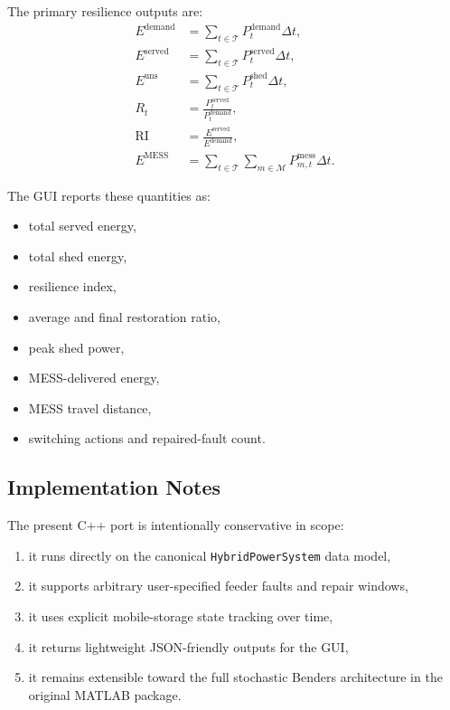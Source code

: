 The primary resilience outputs are:
\begin{align}
E^{\mathrm{demand}} &= \sum_{t\in\mathcal{T}} P^{\mathrm{demand}}_t \Delta t, \\
E^{\mathrm{served}} &= \sum_{t\in\mathcal{T}} P^{\mathrm{served}}_t \Delta t, \\
E^{\mathrm{uns}} &= \sum_{t\in\mathcal{T}} P^{\mathrm{shed}}_t \Delta t, \\
R_t &= \frac{P^{\mathrm{served}}_t}{P^{\mathrm{demand}}_t}, \\
\mathrm{RI} &= \frac{E^{\mathrm{served}}}{E^{\mathrm{demand}}}, \\
E^{\mathrm{MESS}} &= \sum_{t\in\mathcal{T}} \sum_{m\in\mathcal{M}} P^{\mathrm{mess}}_{m,t} \Delta t.
\end{align}

The GUI reports these quantities as:
\begin{itemize}
  \item total served energy,
  \item total shed energy,
  \item resilience index,
  \item average and final restoration ratio,
  \item peak shed power,
  \item MESS-delivered energy,
  \item MESS travel distance,
  \item switching actions and repaired-fault count.
\end{itemize}

\subsection{Implementation Notes}

The present C++ port is intentionally conservative in scope:
\begin{enumerate}
  \item it runs directly on the canonical \texttt{HybridPowerSystem} data model,
  \item it supports arbitrary user-specified feeder faults and repair windows,
  \item it uses explicit mobile-storage state tracking over time,
  \item it returns lightweight JSON-friendly outputs for the GUI,
  \item it remains extensible toward the full stochastic Benders architecture in
        the original MATLAB package.
\end{enumerate}


